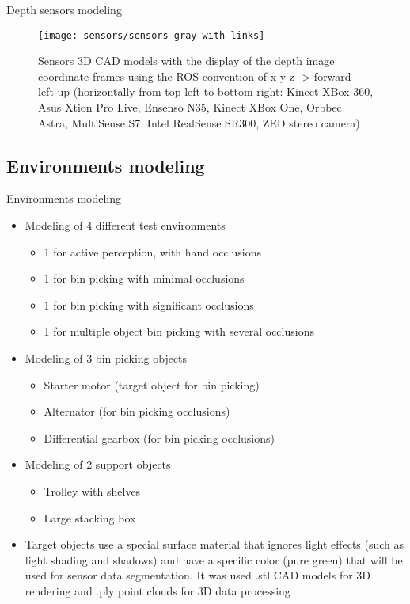 \begin{frame}{Depth sensors modeling}
	\begin{figure}
		\centering
		\texttt{[image: sensors/sensors-gray-with-links]}
		\caption{Sensors 3D CAD models with the display of the depth image coordinate frames using the ROS convention of x-y-z -> forward-left-up (horizontally from top left to bottom right: Kinect XBox 360, Asus Xtion Pro Live, Ensenso N35, Kinect XBox One, Orbbec Astra, MultiSense S7, Intel RealSense SR300, ZED stereo camera)}
	\end{figure}
\end{frame}


\subsection*{Environments modeling}
\begin{frame}{Environments modeling}
	\begin{itemize}
		\item Modeling of 4 different test environments
			\begin{itemize}
				\item 1 for active perception, with hand occlusions
				\item 1 for bin picking with minimal occlusions
				\item 1 for bin picking with significant occlusions
				\item 1 for multiple object bin picking with several occlusions
			\end{itemize}
		\item Modeling of 3 bin picking objects
		\begin{itemize}
			\item Starter motor (target object for bin picking)
			\item Alternator (for bin picking occlusions)
			\item Differential gearbox (for bin picking occlusions)
		\end{itemize}
		\item Modeling of 2 support objects
		\begin{itemize}
			\item Trolley with shelves
			\item Large stacking box
		\end{itemize}
		\item Target objects use a special surface material that ignores light effects (such as light shading and shadows) and have a specific color (pure green) that will be used for sensor data segmentation. It was used .stl CAD models for 3D rendering and .ply point clouds for 3D data processing
	\end{itemize}
\end{frame}


